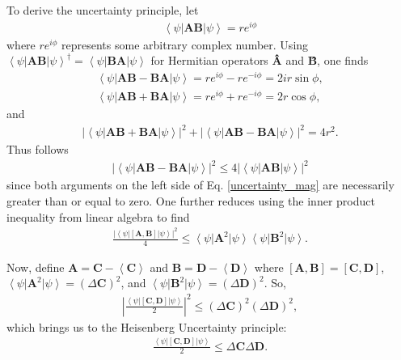 \documentclass[11pt]{article} %
\newcommand{\bra}[1]{\left\langle #1 \right|}
\newcommand{\ket}[1]{\left|#1\right\rangle}
\begin{document}
To derive the uncertainty principle, let
\begin{align}
    \bra{\psi}\textbf{AB}\ket{\psi} = re^{i\phi}
\end{align}
where $re^{i\phi}$ represents some arbitrary complex number. Using $\bra{\psi}\textbf{AB}\ket{\psi}^\dagger = \bra{\psi}\textbf{BA}\ket{\psi}$ for Hermitian operators \textbf{\^A} and \textbf{\^B}, one finds
\begin{align}
    \bra{\psi}\textbf{AB}-\textbf{BA}\ket{\psi} = re^{i\phi} - re^{-i\phi} = 2ir\sin\phi,\\
    \bra{\psi}\textbf{AB}+\textbf{BA}\ket{\psi} = re^{i\phi} + re^{-i\phi} = 2r\cos\phi,
\end{align}{}
and
\begin{align}
    \left|\bra{\psi}\textbf{AB}+\textbf{BA}\ket{\psi}\right|^2 + \left|\bra{\psi}\textbf{AB}-\textbf{BA}\ket{\psi}\right|^2 = 4r^2.
    \label{uncertainty_mag}
\end{align}
Thus follows
\begin{align}
    \left|\bra{\psi}\textbf{AB}-\textbf{BA}\ket{\psi}\right|^2 \leq 4\left|\bra{\psi}\textbf{AB}\ket{\psi}\right|^2
\end{align}
since both arguments on the left side of 
Eq. \ref{uncertainty_mag} are necessarily greater than or equal to zero. One further reduces using the inner product inequality from linear algebra to find
\begin{align}
    \frac{\left|\bra{\psi}\left[\textbf{A},\textbf{B}\right]\ket{\psi}\right|^2}{4} \leq \bra{\psi}\textbf{A}^2\ket{\psi}\bra{\psi}\textbf{B}^2\ket{\psi}.
\end{align}

Now, define $\textbf{A} = \textbf{C} - \left<\textbf{C}\right>$ and $\textbf{B} = \textbf{D} - \left<\textbf{D}\right>$ where $\left[\textbf{A},\textbf{B}\right] = \left[\textbf{C},\textbf{D}\right]$, $\bra{\psi}\textbf{A}^2\ket{\psi} = \left(\Delta\textbf{C}\right)^2$, and $\bra{\psi}\textbf{B}^2\ket{\psi} = \left(\Delta\textbf{D}\right)^2$. So,
\begin{align}
    \left|\frac{\bra{\psi}\left[\textbf{C},\textbf{D}\right]\ket{\psi}}{2}\right|^2 \leq \left(\Delta\textbf{C}\right)^2\left(\Delta\textbf{D}\right)^2,
\end{align}
which brings us to the Heisenberg Uncertainty principle:
\begin{align}
    \frac{\bra{\psi}\left[\textbf{C},\textbf{D}\right]\ket{\psi}}{2} \leq \Delta\textbf{C}\Delta\textbf{D}.
\end{align}
\end{document}
